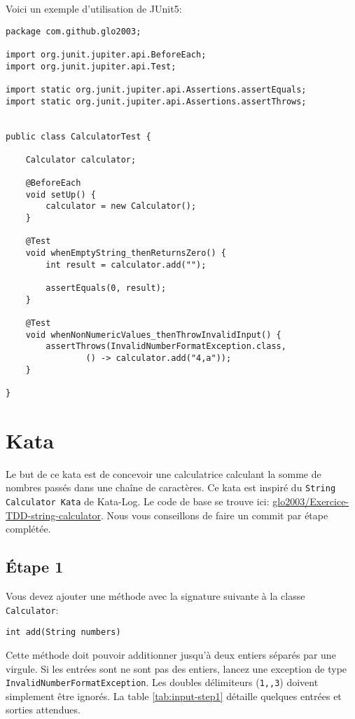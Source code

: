 \documentclass[french]{article}
\begin{document}
\newpage
\noindent Voici un exemple d'utilisation de JUnit5:
\begin{lstlisting}
package com.github.glo2003;

import org.junit.jupiter.api.BeforeEach;
import org.junit.jupiter.api.Test;

import static org.junit.jupiter.api.Assertions.assertEquals;
import static org.junit.jupiter.api.Assertions.assertThrows;


public class CalculatorTest {

    Calculator calculator;

    @BeforeEach
    void setUp() {
        calculator = new Calculator();
    }
    
    @Test
    void whenEmptyString_thenReturnsZero() {
        int result = calculator.add("");

        assertEquals(0, result);
    }
    
    @Test
    void whenNonNumericValues_thenThrowInvalidInput() {
        assertThrows(InvalidNumberFormatException.class,
                () -> calculator.add("4,a"));
    }

}
\end{lstlisting}

\newpage
\section{Kata}
Le but de ce kata est de concevoir une calculatrice calculant la somme de nombres passés dans une chaîne de caractères. Ce kata est inspiré du \texttt{String Calculator Kata} de Kata-Log\cite{stringKata}. Le code de base se trouve ici: \href{https://github.com/glo2003/Exercice-TDD-string-calculator}{glo2003/Exercice-TDD-string-calculator}. Nous vous conseillons de faire un commit par étape complétée.

\subsection{Étape 1}
Vous devez ajouter une méthode avec la signature suivante à la classe \texttt{Calculator}:

\begin{lstlisting}
int add(String numbers)
\end{lstlisting}

Cette méthode doit pouvoir additionner jusqu'à deux entiers séparés par une virgule. Si les entrées sont ne sont pas des entiers, lancez une exception de type \texttt{InvalidNumberFormatException}. Les doubles délimiteurs (\texttt{1,,3}) doivent simplement être ignorés. La table \ref{tab:input-step1} détaille quelques entrées et sorties attendues.
\end{document}

